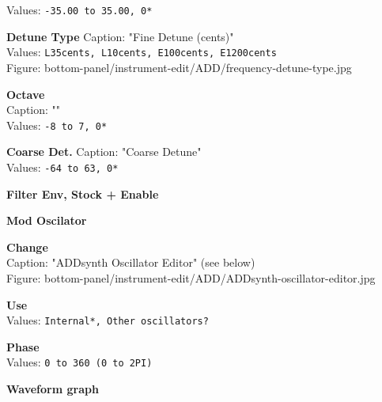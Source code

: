 \documentclass[
 11pt,
 twoside,
 a4paper,
 headinclude,
 footinclude,
 final                                 %
]{article}
\begin{document}
\begin{enumber}
\begin{enumber}
\begin{enumber}
\begin{enumber}
\begin{enumber}
\begin{enumber}
                           Values: \texttt{-35.00 to 35.00, 0*} \\
                        \item \textbf{Detune Type}
                           Caption: "Fine Detune (cents)" \\
                           Values: \texttt{L35cents, L10cents, E100cents, E1200cents} \\
                           Figure: bottom-panel/instrument-edit/ADD/frequency-detune-type.jpg
                        \item \textbf{Octave} \\
                           Caption: "" \\
                           Values: \texttt{-8 to 7, 0*}
                        \item \textbf{Coarse Det.}
                           Caption: "Coarse Detune" \\
                           Values: \texttt{-64 to 63, 0*}
                        \item \textbf{Filter Env, Stock + Enable}
                     \end{enumber}
                  \item \textbf{Mod Oscilator}
                     \begin{enumber}
                        \item \textbf{Change} \\
                           Caption: "ADDsynth Oscillator Editor" (see below)\\
                           Figure: bottom-panel/instrument-edit/ADD/ADDsynth-oscillator-editor.jpg

                        \item \textbf{Use} \\
                           Values: \texttt{Internal*, Other oscillators?}
                        \item \textbf{Phase} \\
                           Values: \texttt{0 to 360 (0 to 2PI)}
                        \item \textbf{Waveform graph}
                     \end{enumber}

               \end{enumber}

 

\end{enumber}
\end{enumber}
\end{enumber}
\end{enumber}
\end{document}
